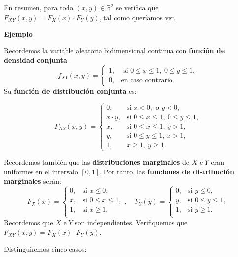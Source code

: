 \documentclass[]{book}
\begin{document}
En resumen, para todo \((x,y)\in \mathbb{R}^2\) se verifica que \(F_{XY}(x,y)=F_X(x)\cdot F_Y(y)\), tal como queríamos ver.

\textbf{Ejemplo}

Recordemos la variable aleatoria bidimensional continua con \textbf{función de densidad conjunta}:
\[
f_{XY}(x,y)=\begin{cases}
1, & \mbox{ si }0\leq x\leq 1,\ 0\leq y\leq 1, \\
0, & \mbox{en caso contrario.}
\end{cases}
\]
Su \textbf{función de distribución conjunta} es:

\[
F_{XY}(x,y)=\begin{cases}
0, & \mbox{si }x<0,\mbox{ o }y<0,\\
x\cdot y, & \mbox{si }0\leq x\leq 1,\ 0\leq y\leq 1, \\
x, & \mbox{si }0\leq x\leq 1,\ y> 1, \\
y, & \mbox{si }0\leq y\leq 1,\ x> 1, \\
1, & x\geq 1,\ y\geq 1.
\end{cases}
\]

Recordemos también que las \textbf{distribuciones marginales} de \(X\) e \(Y\) eran uniformes en el intervalo \([0,1]\). Por tanto, las \textbf{funciones de distribución marginales} serán:
\[
F_X(x)=\begin{cases}
0, & \mbox{si }x\leq 0, \\
x, & \mbox{si }0\leq x\leq 1, \\
1, & \mbox{si }x\geq 1. \\
\end{cases},\quad 
F_Y(y)=\begin{cases}
0, & \mbox{si }y\leq 0, \\
y, & \mbox{si }0\leq y\leq 1, \\
1, & \mbox{si }y\geq 1. \\
\end{cases}
\]
Recordemos que \(X\) e \(Y\) son independientes. Verifiquemos que \(F_{XY}(x,y)=F_X(x)\cdot F_Y(y)\).

Distinguiremos cinco casos:
\end{document}
